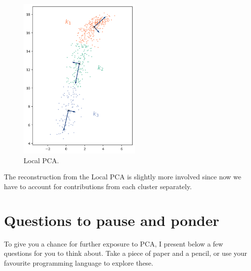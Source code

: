 \documentclass[10pt,twocolumn]{article}
\begin{document}
\begin{figure}[H]
\centering\includegraphics[width=6cm]{lpca-on-nonlinear-data.png}
\caption{Local PCA.}
\label{fig:local-pca}
\end{figure}

The reconstruction from the Local PCA is slightly more involved since now we have to account for contributions from each cluster separately.







\appendix


\newpage

\section{Questions to pause and ponder} \label{app:questions}

To give you a chance for further exposure to PCA, I present below a few questions for you to think about. Take a piece of paper and a pencil, or use your favourite programming language to explore these.
\end{document}
